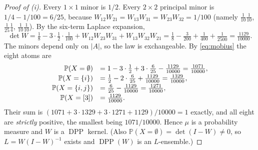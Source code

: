 \documentclass[11pt]{amsart}
\theoremstyle{remark}
\DeclareMathOperator{\DPP}{DPP}
\begin{document}
\begin{proof}[Proof of (i)]
Every $1\times1$ minor is $1/2$. Every $2\times2$ principal minor is
$1/4-1/100=6/25$, because
$W_{12}W_{21}=W_{13}W_{31}=W_{23}W_{32}=1/100$ (namely
$\tfrac1{10}\tfrac1{10}$, $\tfrac1{25}\tfrac14$, $\tfrac1{10}\tfrac1{10}$). By the six-term
Laplace expansion,
\[
 \det W=\tfrac18-3\cdot\tfrac12\cdot\tfrac1{100}
 +W_{12}W_{23}W_{31}+W_{13}W_{32}W_{21}
 =\tfrac18-\tfrac3{200}+\tfrac1{400}+\tfrac1{2500}=\tfrac{1129}{10000}.
\]
The minors depend only on $|A|$, so the law is exchangeable. By \eqref{eq:mobius} the eight
atoms are
\[
 \begin{array}{r@{\quad}l}
  \mathbb P(X=\emptyset) &=1-3\cdot\tfrac12+3\cdot\tfrac6{25}-\tfrac{1129}{10000}
   =\tfrac{1071}{10000},\\[2pt]
  \mathbb P(X=\{i\}) &=\tfrac12-2\cdot\tfrac6{25}+\tfrac{1129}{10000}
   =\tfrac{1329}{10000},\\[2pt]
  \mathbb P(X=\{i,j\}) &=\tfrac6{25}-\tfrac{1129}{10000}=\tfrac{1271}{10000},\\[2pt]
  \mathbb P(X=[3]) &=\tfrac{1129}{10000}.
 \end{array}
\]
Their sum is $(1071+3\cdot1329+3\cdot1271+1129)/10000=1$ exactly, and all eight are
\emph{strictly} positive, the smallest being $1071/10000$. Hence $\mu$ is a probability
measure and $W$ is a $\DPP$ kernel. (Also $\mathbb P(X=\emptyset)=\det(I-W)\ne0$, so
$L=W(I-W)^{-1}$ exists and $\DPP(W)$ is an $L$-ensemble.)
\end{proof}
\end{document}

